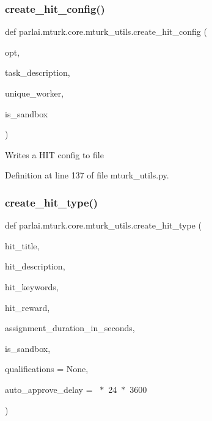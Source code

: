 \subsubsection{\texorpdfstring{create\+\_\+hit\+\_\+config()}{create\_hit\_config()}}
{\footnotesize\ttfamily def parlai.\+mturk.\+core.\+mturk\+\_\+utils.\+create\+\_\+hit\+\_\+config (\begin{DoxyParamCaption}\item[{}]{opt,  }\item[{}]{task\+\_\+description,  }\item[{}]{unique\+\_\+worker,  }\item[{}]{is\+\_\+sandbox }\end{DoxyParamCaption})}

\begin{DoxyVerb}Writes a HIT config to file\end{DoxyVerb}
 

Definition at line 137 of file mturk\+\_\+utils.\+py.

\mbox{\label{namespaceparlai_1_1mturk_1_1core_1_1mturk__utils_a2812666cca37ae0fa15e1843d3a87cd4}} 
\subsubsection{\texorpdfstring{create\+\_\+hit\+\_\+type()}{create\_hit\_type()}}
{\footnotesize\ttfamily def parlai.\+mturk.\+core.\+mturk\+\_\+utils.\+create\+\_\+hit\+\_\+type (\begin{DoxyParamCaption}\item[{}]{hit\+\_\+title,  }\item[{}]{hit\+\_\+description,  }\item[{}]{hit\+\_\+keywords,  }\item[{}]{hit\+\_\+reward,  }\item[{}]{assignment\+\_\+duration\+\_\+in\+\_\+seconds,  }\item[{}]{is\+\_\+sandbox,  }\item[{}]{qualifications = {\ttfamily None},  }\item[{}]{auto\+\_\+approve\+\_\+delay = {~$\ast$~24~$\ast$~3600} }\end{DoxyParamCaption})}

